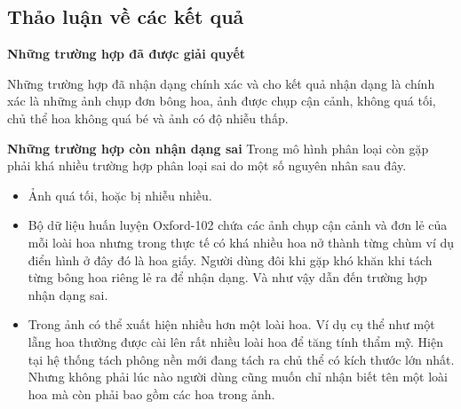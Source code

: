 \documentclass[12pt]{report}
\begin{document}
		\subsection{Thảo luận về các kết quả}
		
		\textbf{	Những trường hợp đã được giải quyết}
		
		Những trường hợp đã nhận dạng chính xác và cho kết quả nhận dạng là chính xác là những ảnh chụp đơn bông hoa, ảnh được chụp cận cảnh, không quá tối, chủ thể hoa không quá bé và ảnh có độ nhiễu thấp.
		
		\textbf{Những trường hợp còn nhận dạng sai}
		Trong mô hình phân loại còn gặp phải khá nhiều trường hợp phân loại sai do một số nguyên nhân sau đây.
		\begin{itemize}
			\item Ảnh quá tối, hoặc bị nhiễu nhiều.
			\item Bộ dữ liệu huấn luyện Oxford-102 chứa các ảnh chụp cận cảnh và đơn lẻ của mỗi loài hoa nhưng trong thực tế có khá nhiều hoa nở thành từng chùm ví dụ điển hình ở đây đó là hoa giấy. Người dùng đôi khi gặp khó khăn khi tách từng bông hoa riêng lẻ ra để nhận dạng. Và như vậy dẫn đến trường hợp nhận dạng sai.
			\item Trong ảnh có thể xuất hiện nhiều hơn một loài hoa. Ví dụ cụ thể như một lẵng hoa thường được cài lên rất nhiều loài hoa để tăng tính thẩm mỹ. Hiện tại hệ thống tách phông nền mới đang tách ra chủ thể có kích thước lớn nhất. Nhưng không phải lúc nào người dùng cũng muốn chỉ nhận biết tên một loài hoa mà còn phải bao gồm các hoa trong ảnh.
		\end{itemize}
\end{document}
